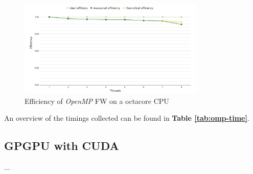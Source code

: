 \begin{figure}[h!]
\centering                                                                        
\includegraphics[width=3.5in]{diagrams/openmp-efficiency}
\captionsetup{justification=centering,margin=2cm}                                                                                                                                   
\caption{Efficiency of \emph{OpenMP} FW on a octacore CPU}                                                                                                                                            
\label{fig:omp-efficiency}                                                                                                                                                           
\end{figure}
An overview of the timings collected can be found in \textbf{Table \ref*{tab:omp-time}}.













































































\subsection{GPGPU with CUDA}
...

